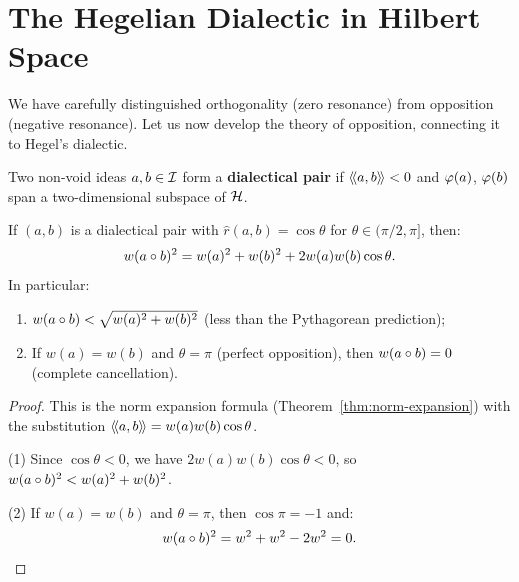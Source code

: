 \section{The Hegelian Dialectic in Hilbert Space}

We have carefully distinguished orthogonality (zero resonance) from opposition
(negative resonance). Let us now develop the theory of opposition, connecting
it to Hegel's dialectic.

\begin{definition}
\label{def:dialectical}
Two non-void ideas $a, b \in \mathcal{I}$ form a \textbf{dialectical pair} if
$\langle\!\langle a, b \rangle\!\rangle < 0$ and $\varphi(a)$, $\varphi(b)$ span a two-dimensional subspace
of $\mathcal{H}$.
\end{definition}

\begin{theorem}
\label{thm:dialectical-weight}
If $(a, b)$ is a dialectical pair with $\hat{r}(a, b) = \cos\theta$ for
$\theta \in (\pi/2, \pi]$, then:
\[
  w(a \circ b)^2 = w(a)^2 + w(b)^2 + 2w(a)w(b)\cos\theta.
\]
In particular:
\begin{enumerate}
\item $w(a \circ b) < \sqrt{w(a)^2 + w(b)^2}$ (less than the Pythagorean
prediction);
\item If $w(a) = w(b)$ and $\theta = \pi$ (perfect opposition), then
$w(a \circ b) = 0$ (complete cancellation).
\end{enumerate}
\end{theorem}

\begin{proof}
This is the norm expansion formula (Theorem~\ref{thm:norm-expansion}) with the
substitution $\langle\!\langle a, b \rangle\!\rangle = w(a)w(b)\cos\theta$.

(1) Since $\cos\theta < 0$, we have $2w(a)w(b)\cos\theta < 0$, so
$w(a \circ b)^2 < w(a)^2 + w(b)^2$.

(2) If $w(a) = w(b)$ and $\theta = \pi$, then $\cos\pi = -1$ and:
\[
  w(a \circ b)^2 = w^2 + w^2 - 2w^2 = 0.
\]
\end{proof}

